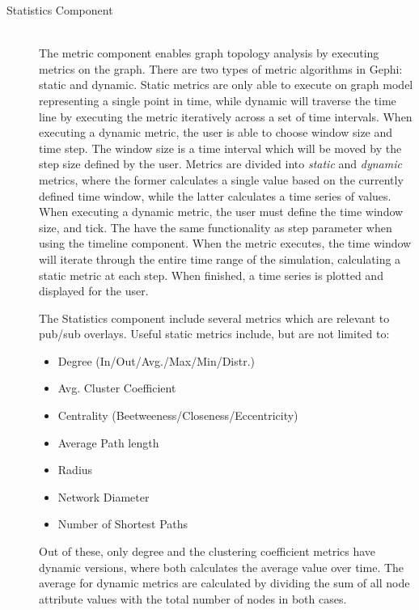 \begin{description}
\item[Statistics Component] \hfill \\

    The metric component enables graph topology analysis by executing
    metrics on the graph. There are two types of metric algorithms in Gephi:
    static and dynamic. Static metrics are only able to execute on graph
    model representing a single point in time, while dynamic will traverse
    the time line by executing the metric iteratively across a set of time
    intervals. When executing a dynamic metric, the user is able to choose
    window size and time step. The window size is a time interval which will
    be moved by the step size defined by the user. Metrics are divided
    into \emph{static} and \emph{dynamic} metrics, where the former
    calculates a single value based on the currently defined time
    window, while the latter calculates a time series of values. When
    executing a dynamic metric, the user must define the time window
    size, and tick. The have the same functionality as step parameter
    when using the timeline component. When the metric executes,
    the time window will iterate through the entire time range of the
    simulation, calculating a static metric at each step. When finished,
    a time series is plotted and displayed for the user.

    The Statistics component include several metrics which are relevant
    to pub/sub overlays. Useful static metrics include, but are not
    limited to:

    \begin{itemize}
        \item{Degree (In/Out/Avg./Max/Min/Distr.)}
        \item{Avg. Cluster Coefficient}
        \item{Centrality (Beetweeness/Closeness/Eccentricity)}
        \item{Average Path length}
        \item{Radius}
        \item{Network Diameter}
        \item{Number of Shortest Paths}
    \end{itemize}

    Out of these, only degree and the clustering coefficient metrics have dynamic
    versions, where both calculates the average value over time. The
    average for dynamic metrics are calculated by dividing the sum of
    all node attribute values with the total number of nodes in both
    cases.


\end{description}
